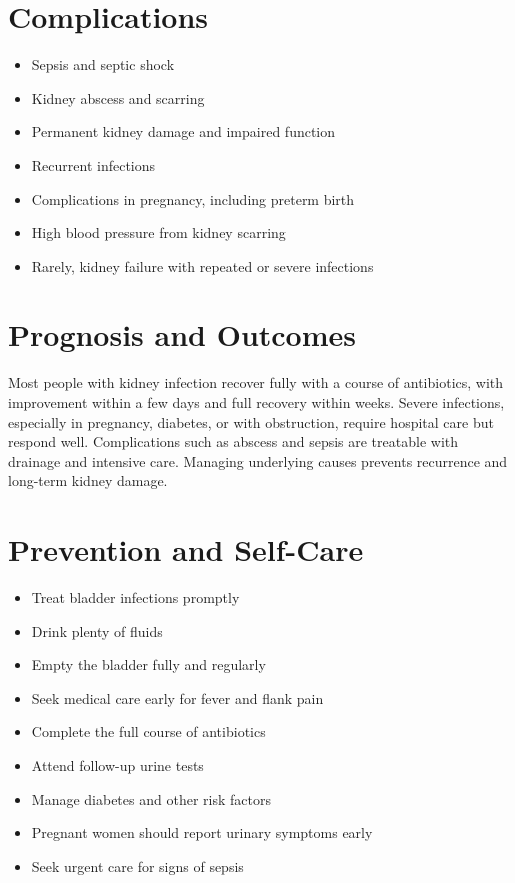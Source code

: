 \section*{Complications}
\begin{itemize}
    \item Sepsis and septic shock
    \item Kidney abscess and scarring
    \item Permanent kidney damage and impaired function
    \item Recurrent infections
    \item Complications in pregnancy, including preterm birth
    \item High blood pressure from kidney scarring
    \item Rarely, kidney failure with repeated or severe infections
\end{itemize}

\section*{Prognosis and Outcomes}
Most people with kidney infection recover fully with a course of antibiotics, with improvement within a few days and full recovery within weeks. Severe infections, especially in pregnancy, diabetes, or with obstruction, require hospital care but respond well. Complications such as abscess and sepsis are treatable with drainage and intensive care. Managing underlying causes prevents recurrence and long-term kidney damage.

\section*{Prevention and Self-Care}
\begin{itemize}
    \item Treat bladder infections promptly
    \item Drink plenty of fluids
    \item Empty the bladder fully and regularly
    \item Seek medical care early for fever and flank pain
    \item Complete the full course of antibiotics
    \item Attend follow-up urine tests
    \item Manage diabetes and other risk factors
    \item Pregnant women should report urinary symptoms early
    \item Seek urgent care for signs of sepsis
\end{itemize}

